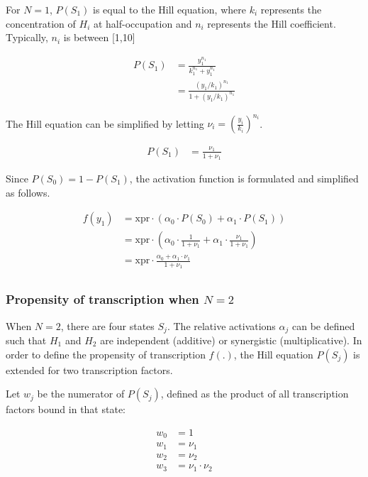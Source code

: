 \documentclass[
  table,
  10pt,
  a4paper]{article}
\begin{document}
For \(N=1\), \(P(S_1)\) is equal to the Hill equation, where \(k_i\)
represents the concentration of \(H_i\) at half-occupation and \(n_i\)
represents the Hill coefficient. Typically, \(n_i\) is between
{[}1,10{]}

\begin{align}
  P(S_1) & = \frac{y_1^{n_1}}{k_1^{n_1} + y_1^{n_1}} \\
             & = \frac{(y_1/k_1)^{n_1}}{1 + (y_1/k_1)^{n_1}}
\end{align}

The Hill equation can be simplified by letting
\(\nu_i = \left(\frac{y_i}{k_i}\right)^{n_i}\).

\begin{align}
P(S_1) & = \frac{\nu_1}{1 + \nu_1} \label{eqn:hillsimp}
\end{align}

Since \(P(S_0) = 1 - P(S_1)\), the activation function is formulated and
simplified as follows.

\begin{align}
f(y_1) & = \text{xpr} \cdot \left(\alpha_0 \cdot P(S_0) + \alpha_1 \cdot P(S_1)\right) \\
           & = \text{xpr} \cdot \left(\alpha_0 \cdot \frac{1}{1 + \nu_1} + \alpha_1 \cdot \frac{\nu_1}{1 + \nu_1}\right) \\
           & = \text{xpr} \cdot \frac{\alpha_0 + \alpha_1 \cdot \nu_1}{1 + \nu_1} \\
\end{align}

\hypertarget{propensity-of-transcription-when-n2}{%
\subsubsection{\texorpdfstring{Propensity of transcription when
\(N=2\)}{Propensity of transcription when N=2}}\label{propensity-of-transcription-when-n2}}

When \(N=2\), there are four states \(S_j\). The relative activations
\(\alpha_j\) can be defined such that \(H_1\) and \(H_2\) are
independent (additive) or synergistic (multiplicative). In order to
define the propensity of transcription \(f(.)\), the Hill equation
\(P(S_j)\) is extended for two transcription factors.

Let \(w_j\) be the numerator of \(P(S_j)\), defined as the product of
all transcription factors bound in that state:

\begin{align}
w_0 & = 1 \\
w_1 & = \nu_1 \\
w_2 & = \nu_2 \\
w_3 & = \nu_1 \cdot \nu_2
\end{align}
\end{document}
